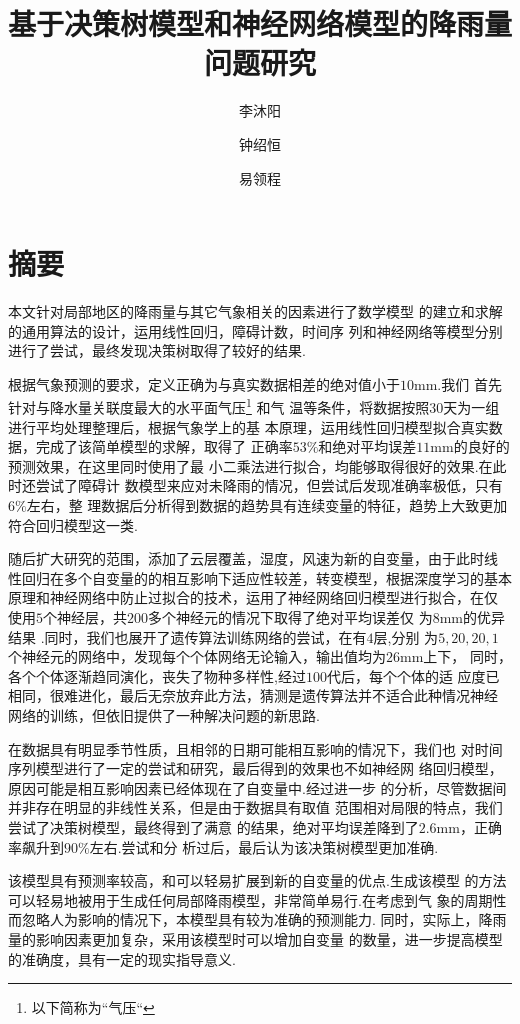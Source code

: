 \documentclass[UTF8, a4paper]{ctexart}
\title{基于决策树模型和神经网络模型的降雨量问题研究}
\author{李沐阳 \and 钟绍恒 \and 易领程}
\begin{document}
\maketitle



\section{摘要}

本文针对局部地区的降雨量与其它气象相关的因素进行了数学模型
的建立和求解的通用算法的设计，运用线性回归，障碍计数，时间序
列和神经网络等模型分别进行了尝试，最终发现决策树取得了较好的结果.

根据气象预测的要求，定义正确为与真实数据相差的绝对值小于$10$\si{\milli\meter}.我们
首先针对与降水量关联度最大的水平面气压\footnote{以下简称为``气压``} 和气
温等条件，将数据按照$30$天为一组进行平均处理整理后，根据气象学上的基
本原理，运用线性回归模型拟合真实数据，完成了该简单模型的求解，取得了
正确率$53 \%$和绝对平均误差$11$mm的良好的预测效果，在这里同时使用了最
小二乘法进行拟合，均能够取得很好的效果.在此时还尝试了障碍计
数模型来应对未降雨的情况，但尝试后发现准确率极低，只有$6\%$左右，整
理数据后分析得到数据的趋势具有连续变量的特征，趋势上大致更加符合回归模型这一类.

随后扩大研究的范围，添加了云层覆盖，湿度，风速为新的自变量，由于此时线
性回归在多个自变量的的相互影响下适应性较差，转变模型，根据深度学习的基本
原理和神经网络中防止过拟合的技术，运用了神经网络回归模型进行拟合，在仅
使用$5$个神经层，共$200$多个神经元的情况下取得了绝对平均误差仅
为$8$\si{\milli\meter}的优异结果 .同时，我们也展开了遗传算法训练网络的尝试，在有$4$层,分别
为$5,20,20,1$个神经元的网络中，发现每个个体网络无论输入，输出值均为$26$\si{\milli\meter}上下，
同时，各个个体逐渐趋同演化，丧失了物种多样性,经过$100$代后，每个个体的适
应度已相同，很难进化，最后无奈放弃此方法，猜测是遗传算法并不适合此种情况神经
网络的训练，但依旧提供了一种解决问题的新思路.

在数据具有明显季节性质，且相邻的日期可能相互影响的情况下，我们也
对时间序列模型进行了一定的尝试和研究，最后得到的效果也不如神经网
络回归模型，原因可能是相互影响因素已经体现在了自变量中.经过进一步
的分析，尽管数据间并非存在明显的非线性关系，但是由于数据具有取值
范围相对局限的特点，我们尝试了决策树模型，最终得到了满意
的结果，绝对平均误差降到了$2.6$mm，正确率飙升到$90\%$左右.尝试和分
析过后，最后认为该决策树模型更加准确.

该模型具有预测率较高，和可以轻易扩展到新的自变量的优点.生成该模型
的方法可以轻易地被用于生成任何局部降雨模型，非常简单易行.在考虑到气
象的周期性而忽略人为影响的情况下，本模型具有较为准确的预测能力.
同时，实际上，降雨量的影响因素更加复杂，采用该模型时可以增加自变量
的数量，进一步提高模型的准确度，具有一定的现实指导意义.
\end{document}
